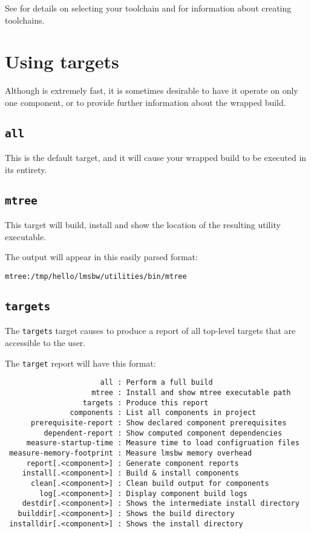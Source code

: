 See  for details on selecting your
toolchain and  for information
about creating toolchains.

\section{Using \lmsbw targets}\label{lmsbw:target:verbs}

Although \lmsbw is extremely fast, it is sometimes desirable to have
it operate on only one component, or to provide further information
about the wrapped build.

\subsection{\texttt{all}}\label{lmsbw:target:all}

This is the default target, and it will cause your wrapped build to be
executed in its entirety.

\subsection{\texttt{mtree}}

This target will build, install and show the location of the resulting
\mtree utility executable.

The output will appear in this easily parsed format:

\begin{verbatim}
mtree:/tmp/hello/lmsbw/utilities/bin/mtree
\end{verbatim}

\subsection{\texttt{targets}}

The \texttt{targets} target causes \lmsbw to produce a report of all
top-level targets that are accessible to the user.

The \texttt{target} report will have this format:

\begin{footnotesize}
\begin{verbatim}
                      all : Perform a full build
                    mtree : Install and show mtree executable path
                  targets : Produce this report
               components : List all components in project
      prerequisite-report : Show declared component prerequisites
         dependent-report : Show computed component dependencies
     measure-startup-time : Measure time to load configruation files
 measure-memory-footprint : Measure lmsbw memory overhead
     report[.<component>] : Generate component reports
    install[.<component>] : Build & install components
      clean[.<component>] : Clean build output for components
        log[.<component>] : Display component build logs
    destdir[.<component>] : Shows the intermediate install directory
   builddir[.<component>] : Shows the build directory
 installdir[.<component>] : Shows the install directory
\end{verbatim}
\end{footnotesize}

